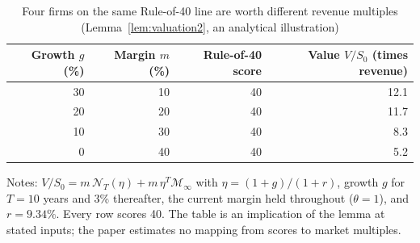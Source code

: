 \begin{table}[t]\centering\small
\caption{Four firms on the same Rule-of-40 line are worth different revenue multiples (Lemma~\ref{lem:valuation2}, an analytical illustration)}\label{tab:isoscore}
\begin{tabular}{@{}rrrr@{}}\toprule
Growth $g$ (\%) & Margin $m$ (\%) & Rule-of-40 score & Value $V/S_0$ (times revenue)\\\midrule
30 & 10 & 40 & 12.1\\
20 & 20 & 40 & 11.7\\
10 & 30 & 40 & 8.3\\
0 & 40 & 40 & 5.2\\
\bottomrule\end{tabular}
\par\vspace{2pt}\footnotesize\raggedright Notes: $V/S_0=m\,\mathcal N_T(\eta)+m\,\eta^T\mathcal M_\infty$ with $\eta=(1+g)/(1+r)$, growth $g$ for $T=10$ years and 3\% thereafter, the current margin held throughout ($\theta=1$), and $r=9.34\%$. Every row scores 40. The table is an implication of the lemma at stated inputs; the paper estimates no mapping from scores to market multiples.
\end{table}